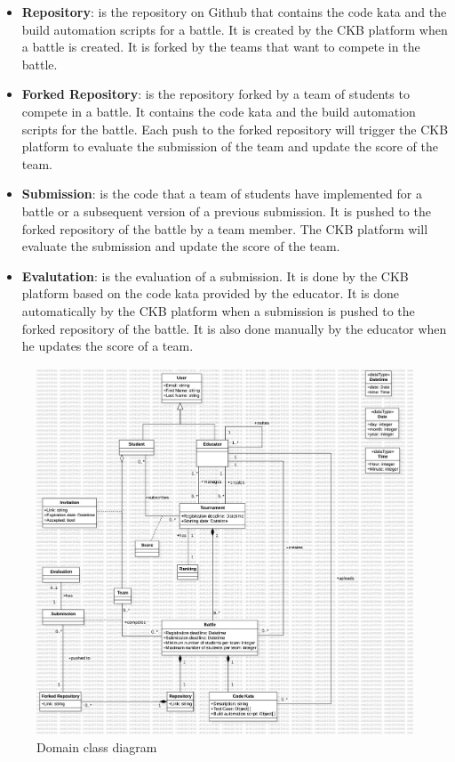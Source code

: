 \begin{itemize}
    \item \textbf{Repository}: is the repository on Github that contains the code kata and the build automation scripts for a battle. It is created by the CKB platform when a battle is created. It is forked by the teams that want to compete in the battle.
    \item \textbf{Forked Repository}: is the repository forked by a team of students to compete in a battle. It contains the code kata and the build automation scripts for the battle. Each push to the forked repository will trigger the CKB platform to evaluate the submission of the team and update the score of the team.
    \item \textbf{Submission}: is the code that a team of students have implemented for a battle or a subsequent version of a previous submission. It is pushed to the forked repository of the battle by a team member. The CKB platform will evaluate the submission and update the score of the team.
    \item \textbf{Evalutation}: is the evaluation of a submission. It is done by the CKB platform based on the code kata provided by the educator. It is done automatically by the CKB platform when a submission is pushed to the forked repository of the battle. It is also done manually by the educator when he updates the score of a team.
\end{itemize}

\begin{figure}[H]
    \centering
    \includegraphics[width=1\textwidth]{Diagrams/DomainClassDiagram.jpg}
    \caption{Domain class diagram}
    \label{fig:domain_class_diagram}
\end{figure}

